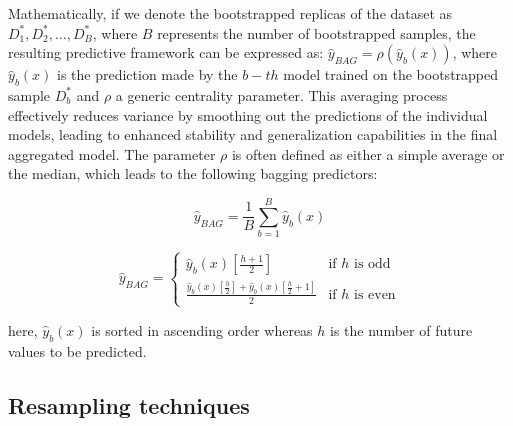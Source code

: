 \documentclass[ijoc,sglanonrev]{informs4}
\begin{document}
Mathematically, if we denote the bootstrapped replicas of the dataset as $D^*_1, D^*_2, \ldots, D^*_B$, where $B$  represents the number of bootstrapped samples, the resulting predictive framework can be expressed as:  $\hat{y}_{\textit{BAG}} = \rho( \hat{y}_{b}(x) )$, where $\hat{y}_{b}(x)$ is the prediction made by the $b-th$ model trained on the bootstrapped sample $ D^*_b $  and $\rho$ a generic centrality parameter. 
This averaging process effectively reduces variance by smoothing out the predictions of the individual models, leading to enhanced stability and generalization capabilities in the final aggregated model.  The parameter $\rho$ is often defined as either a simple average or the median, which leads to the following bagging predictors:

\begin{equation}
\hat{y}_{\textit{BAG}}  = \frac{1}{B} \sum_{b=1}^{B} \hat{y}_{b}(x)
\end{equation}

\begin{equation}
\hat{y}_{\textit{BAG}}  = 
\begin{cases} 
\hat{y}_{b}(x) \left[\frac{h+1}{2}\right] & \text{if } h \text{ is odd} \\ 
\frac{\hat{y}_{b}(x)\left[\frac{h}{2}\right] + \hat{y}_{b}(x)\left[\frac{h}{2} + 1\right]}{2} & \text{if } h \text{ is even} 
\end{cases}
\end{equation}

here, $\hat{y}_{b}(x)$  is  sorted in ascending order whereas $h$ is the number of future values to be predicted.

\subsection{Resampling techniques} \label{Subsec:resampling}
\end{document}
